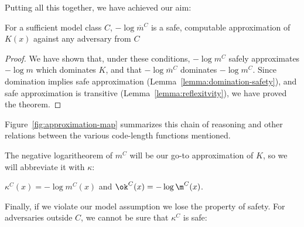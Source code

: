 Putting all this together, we have achieved our aim: 
\begin{theorem}
For a sufficient model class $C$, $-\log \overline{m}^C$ is a safe, computable approximation of $K(x)$ against any adversary from $C$
\label{theorem:safe-computable}
\end{theorem}
\begin{proof}
We have shown that, under these conditions, $-\log m^C$ safely approximates $-\log m$ which dominates $K$, and that $-\log \overline{m}^C$ dominates $-\log m^C$. Since domination implies safe approximation (Lemma~\ref{lemma:domination-safety}), and safe approximation is transitive (Lemma~\ref{lemma:reflexitvity}), we have proved the theorem.  
\end{proof}
Figure~\ref{fig:approximation-map} summarizes this chain of reasoning and other relations between the various code-length functions mentioned.

The negative logaritheorem of $m^C$ will be our go-to approximation of $K$, so we will abbreviate it with $\kappa$:
\begin{definition}
$\kappa^C(x) = -\log m^C(x)$ and $\ok^C(x) = -\log \m^C(x)$.
\end{definition}  
Finally, if we violate our model assumption we lose the property of safety. For adversaries outside $C$, we cannot be sure that $\kappa^C$ is safe:

